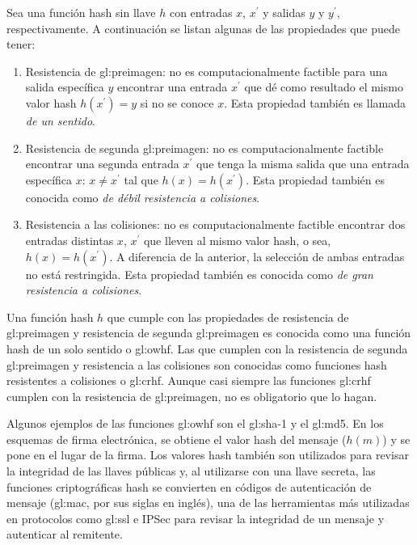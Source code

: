 Sea una función hash sin llave $h$ con entradas $x$, $x^\prime$ y
salidas $y$ y $y^\prime$, respectivamente. A continuación se listan
algunas de las propiedades que puede tener:
\begin{enumerate}
  \item Resistencia de \gls{gl:preimagen}: no es computacionalmente factible
    para una salida específica $y$ encontrar una entrada $x^\prime$ que
    dé como resultado el mismo valor hash $h(x^\prime) = y$ si no se
    conoce $x$. Esta propiedad también es llamada
    \textit{de un sentido}.
  \item Resistencia de segunda \gls{gl:preimagen}: no es computacionalmente
    factible encontrar una segunda entrada $x^\prime$  que tenga la
    misma salida que una entrada específica $x$: $x \neq x^\prime$
    tal que $h(x) = h(x^\prime)$. Esta propiedad también es conocida
    como \textit{de débil resistencia a colisiones}.
  \item Resistencia a las colisiones: no es computacionalmente factible
    encontrar dos entradas distintas $x$, $x^\prime$ que lleven al
    mismo valor hash, o sea, $h(x) = h(x^\prime)$. A diferencia de la
    anterior, la selección de ambas entradas no está restringida. Esta
    propiedad también es conocida como
    \textit{de gran resistencia a colisiones}.
\end{enumerate}

Una función hash $h$ que cumple con las propiedades de resistencia de
\gls{gl:preimagen} y resistencia de segunda \gls{gl:preimagen} es conocida como 
una función hash de un solo sentido o \acrfull{gl:owhf}. 
Las que cumplen con la resistencia de segunda \gls{gl:preimagen} y
resistencia a las colisiones son conocidas como funciones hash
resistentes a colisiones o \acrfull{gl:crhf}. Aunque casi siempre las
funciones \acrshort{gl:crhf} cumplen con la resistencia de \gls{gl:preimagen}, 
no es obligatorio que lo hagan.

Algunos ejemplos de las funciones \acrshort{gl:owhf} son el \acrshort{gl:sha}-1
y el \acrshort{gl:md5}. En los esquemas de firma electrónica, se obtiene el 
valor hash del mensaje ($h(m)$) y se pone en el lugar de la firma. Los valores
hash también son utilizados para revisar la integridad de las llaves
públicas y, al utilizarse con una llave secreta, las funciones
criptográficas hash se convierten en códigos de autenticación de mensaje 
(\acrshort{gl:mac}, por sus siglas en inglés), una de las herramientas más
utilizadas en protocolos como \acrshort{gl:ssl} e IPSec para revisar la 
integridad de un mensaje y autenticar al remitente.

